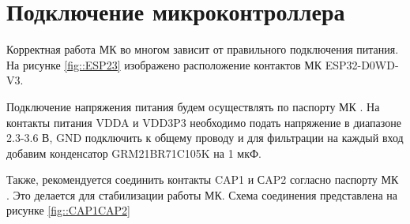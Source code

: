 \section {Подключение микроконтроллера}

Корректная работа МК во многом зависит от правильного подключения питания. На рисунке \ref{fig::ESP23}
изображено расположение контактов МК ESP32-D0WD-V3.


Подключение напряжения питания будем осуществлять по паспорту МК \cite{}. На контакты питания VDDA и VDD3P3 необходимо подать напряжение в диапазоне 2.3-3.6 В, GND подключить к общему проводу и для 
фильтрации на каждый вход добавим конденсатор GRM21BR71C105K на 1 мкФ.

Также, рекомендуется соединить контакты CAP1 и СAP2 согласно паспорту МК \cite{}. Это делается для 
стабилизации работы МК. Схема соединения представлена на рисунке \ref{fig::CAP1CAP2}

